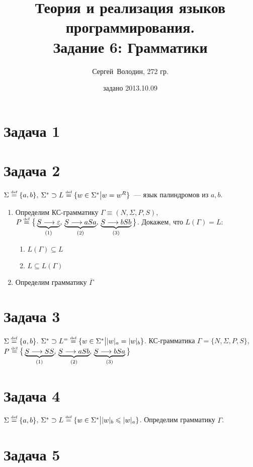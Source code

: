\documentclass[a4paper]{article}
\title{Теория и реализация языков программирования.\\Задание 6: Грамматики}
\date{задано 2013.10.09}
\author{Сергей~Володин, 272 гр.}
\def\eqdef{\overset{\mbox{\tiny def}}{=}}
\begin{document}
\maketitle
\section*{Задача 1}
\section*{Задача 2}
$\Sigma\eqdef\{a,b\}$, $\Sigma^*\supset L\eqdef\{w\in\Sigma^*\big|w=w^R\}$~--- язык палиндромов из $a,b$.
\begin{enumerate}
\item Определим КС-грамматику $\Gamma\equiv(N,\Sigma,P,S)$, $P\eqdef\big\{\underbrace{S\longrightarrow\varepsilon}_{(1)},\,\underbrace{S\longrightarrow aSa}_{(2)},\,\underbrace{S\longrightarrow bSb}_{(3)}\big\}$.
Докажем, что $L(\Gamma)=L$:
\begin{enumerate}
\item $L(\Gamma)\subseteq L$
\item $L\subseteq L(\Gamma)$
\end{enumerate}
\item Определим грамматику $\overline{\Gamma}$
\end{enumerate}
\section*{Задача 3}
$\Sigma\eqdef\{a,b\}$. $\Sigma^*\supset L^=\eqdef\{w\in\Sigma^*\big||w|_a=|w|_b\}$. КС-грамматика $\Gamma=\{N,\Sigma,P,S\}$, $P\eqdef\big\{\underbrace{S\longrightarrow SS}_{(1)},\,\underbrace{S\longrightarrow aSb}_{(2)},\,\underbrace{S\longrightarrow bSa}_{(3)}\big\}$
\section*{Задача 4}
$\Sigma\eqdef\{a,b\}$, $\Sigma^*\supset L\eqdef\{w\in\Sigma^*\big||w|_b\leqslant|w|_a\}$. Определим грамматику $\Gamma$.
\section*{Задача 5}
\end{document}
